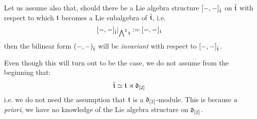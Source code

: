         \begin{convention}
            Let us assume also that, should there be a Lie algebra structure $[-, -]_{\hat{\mathfrak{t}}}$ on $\hat{\mathfrak{t}}$ with respect to which $\mathfrak{t}$ becomes a Lie subalgebra of $\hat{\mathfrak{t}}$, i.e.
                $$[-, -]_{\hat{\mathfrak{t}}}|_{\bigwedge^2 \mathfrak{t}} := [-, -]_{\mathfrak{t}}$$
            then the bilinear form $(-, -)_{\hat{\mathfrak{t}}}$ will be \textit{invariant} with respect to $[-, -]_{\hat{\mathfrak{t}}}$.

            Even though this will turn out to be the case, we do not assume from the beginning that:
                $$\hat{\mathfrak{t}} \simeq \mathfrak{t}\rtimes \mathfrak{d}_{[2]}$$
            i.e. we do not need the assumption that $\mathfrak{t}$ is a $\mathfrak{d}_{[2]}$-module. This is because \textit{a priori}, we have no knowledge of the Lie algebra structure on $\mathfrak{d}_{[2]}$.
        \end{convention}

